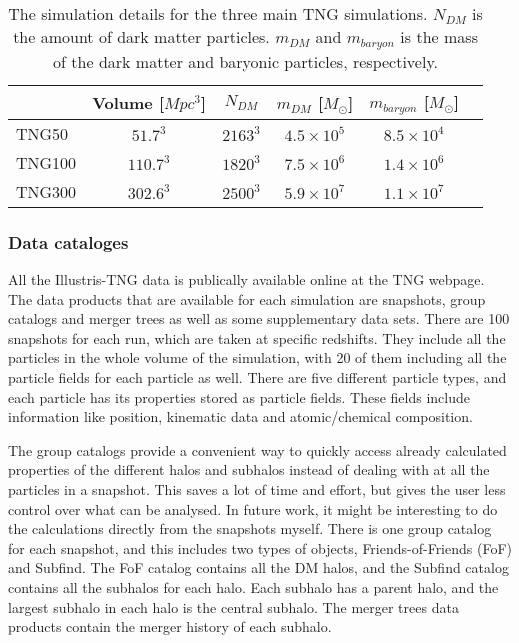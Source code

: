 \begin{table}
\begin{center}
\begin{tabular}{ l| c c c c c } 
 \hline
 \hline
   &  Volume [$Mpc^3$] & $N_{DM}$ & $m_{DM}$ [$M_{\odot}$] & $m_{baryon}$ [$M_{\odot}$] \\
 \hline
 TNG50 & $51.7^3$ & $2163^3$ & $4.5 \times 10^5 $ & $8.5 \times 10^4 $ \\ 
 TNG100 & $110.7^3$ & $1820^3$ & $7.5 \times 10^6 $ & $1.4 \times 10^6 $  \\ 
 TNG300 & $302.6^3$ & $2500^3$ & $5.9 \times 10^7 $ & $1.1 \times 10^7 $  \\ 
 \hline 
 \end{tabular}
\end{center}
\caption{The simulation details for the three main TNG simulations. $N_{DM}$ is the amount of dark matter particles. $m_{DM}$ and $m_{baryon}$ is the mass of the dark matter and baryonic particles, respectively.}
 \label{TNG}
\end{table}

\subsubsection{Data cataloges}
All the Illustris-TNG data is publically available online at the TNG webpage. The data products that are available for each simulation are snapshots, group catalogs and merger trees as well as some supplementary data sets. There are 100 snapshots for each run, which are taken at specific redshifts. They include all the particles in the whole volume of the simulation, with 20 of them including all the particle fields for each particle as well. There are five different particle types, and each particle has its properties stored as particle fields. These fields include information like position, kinematic data and atomic/chemical composition. 


The group catalogs provide a convenient way to quickly access already calculated properties of the different halos and subhalos instead of dealing with at all the particles in a snapshot. This saves a lot of time and effort, but gives the user less control over what can be analysed. In future work, it might be interesting to do the calculations directly from the snapshots myself. There is one group catalog for each snapshot, and this includes two types of objects, Friends-of-Friends (FoF) and Subfind. The FoF catalog contains all the DM halos, and the Subfind catalog contains all the subhalos for each halo. Each subhalo has a parent halo, and the largest subhalo in each halo is the central subhalo. The merger trees data products contain the merger history of each subhalo.

